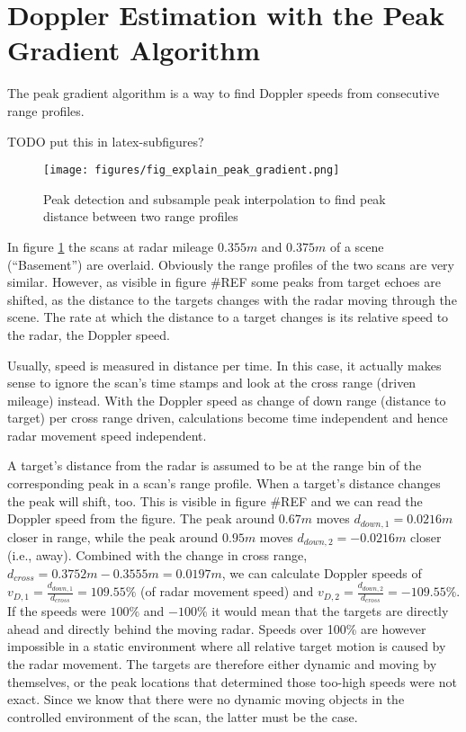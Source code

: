 \section{Doppler Estimation with the Peak Gradient
Algorithm}\label{doppler-estimation-with-the-peak-gradient-algorithm}

The peak gradient algorithm is a way to find Doppler speeds from
consecutive range profiles.

TODO put this in latex-subfigures?

\begin{figure}[htp]
    \centering
    \label{fig:fig_explain_peak_gradient}
    \texttt{[image: figures/fig\_explain\_peak\_gradient.png]}
    \caption{Peak detection and subsample peak interpolation to find peak distance between two range profiles}
\end{figure}

In figure \ref{fig:fig_explain_peak_gradient} the scans at radar mileage \(0.355m\) and \(0.375m\) of
a scene (``Basement'') are overlaid. Obviously the range profiles of the
two scans are very similar. However, as visible in figure \#REF some
peaks from target echoes are shifted, as the distance to the targets
changes with the radar moving through the scene. The rate at which the
distance to a target changes is its relative speed to the radar, the
Doppler speed.

Usually, speed is measured in distance per time. In this case, it
actually makes sense to ignore the scan's time stamps and look at the
cross range (driven mileage) instead. With the Doppler speed as change
of down range (distance to target) per cross range driven, calculations
become time independent and hence radar movement speed independent.

A target's distance from the radar is assumed to be at the range bin of
the corresponding peak in a scan's range profile. When a target's
distance changes the peak will shift, too. This is visible in figure
\#REF and we can read the Doppler speed from the figure. The peak around
\(0.67m\) moves \(d_{down,1} = 0.0216m\) closer in range, while the peak
around \(0.95m\) moves \(d_{down,2} = -0.0216m\) closer (i.e., away).
Combined with the change in cross range,
\(d_{cross} = 0.3752m - 0.3555m = 0.0197m\), we can calculate Doppler
speeds of \(v_{D,1} = \frac{d_{down,1}}{d_{cross}} = 109.55 \%\) (of
radar movement speed) and
\(v_{D,2} = \frac{d_{down,2}}{d_{cross}} = -109.55 \%\). If the speeds
were \(100\%\) and \(-100\%\) it would mean that the targets are directly
ahead and directly behind the moving radar. Speeds over 100\% are
however impossible in a static environment where all relative target
motion is caused by the radar movement. The targets are therefore either
dynamic and moving by themselves, or the peak locations that determined
those too-high speeds were not exact. Since we know that there were no
dynamic moving objects in the controlled environment of the scan, the
latter must be the case.

